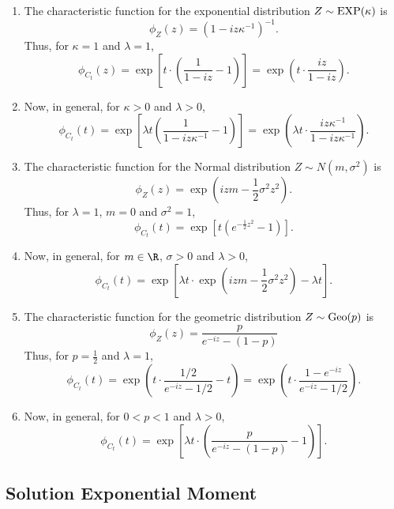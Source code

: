 \begin{enumerate}[label=(\alph*)]
    \item The characteristic function for the exponential distribution $Z \sim \hbox{EXP}(\kappa)$ is
    \[ \phi_Z(z) = ( 1 - iz\kappa^{-1})^{-1}. \]
    Thus, for $\kappa = 1$ and $\lambda = 1$,
    \[ \phi_{C_t}(z) = \exp\left[  t\cdot\left( \frac{1}{1 - iz} - 1 \right) \right] = \exp\left( t\cdot\frac{ iz}{1- iz} \right).\]

    \item Now, in general, for $\kappa > 0$ and $\lambda > 0$,
    \[ \phi_{C_t}(t) = \exp\left[ \lambda t \left( \frac{1}{1 - iz\kappa^{-1}} - 1 \right) \right] = \exp\left(\lambda t\cdot\frac{ iz\kappa^{-1}}{1- iz\kappa^{-1}} \right).\]

    \item The characteristic function for the Normal distribution $Z \sim N(m, \sigma^2)$ is 
    \[ \phi_Z(z) = \exp \left( izm - \frac{1}{2}\sigma^2 z^2 \right).\]
    Thus, for $\lambda = 1$, $m = 0$ and $\sigma^2 = 1$,
    \[ \phi_{C_t}(t) = \exp\left[ t (e^{- \frac{1}{2} z^2} - 1) \right]. \]

    \item Now, in general, for $m \in \R$, $\sigma > 0$ and $\lambda > 0$,
    \[ \phi_{C_t}(t) = \exp\left[ \lambda t \cdot \exp \left( izm - \frac{1}{2}\sigma^2 z^2 \right) - \lambda t \right]. \]

    \item The characteristic function for the geometric distribution $Z \sim \hbox{Geo}(p)$ is
    \[ \phi_Z(z) = \frac{p}{e^{-iz}-(1-p)} \]
    Thus, for $p = \frac{1}{2}$ and $\lambda = 1$,
    \[ \phi_{C_t}(t) = \exp\left( t\cdot \frac{1/2}{e^{-iz}-1/2} - t \right)  = \exp\left( t\cdot  \frac{1-e^{-iz}}{e^{-iz}-1/2} \right). \]

    \item Now, in general, for $0 < p < 1$ and $\lambda > 0$,
    \[ \phi_{C_t}(t) = \exp\left[ \lambda t\cdot \left( \frac{p}{e^{-iz}-(1-p)} - 1  \right) \right]. \]

\end{enumerate}

\subsection*{Solution Exponential Moment}

